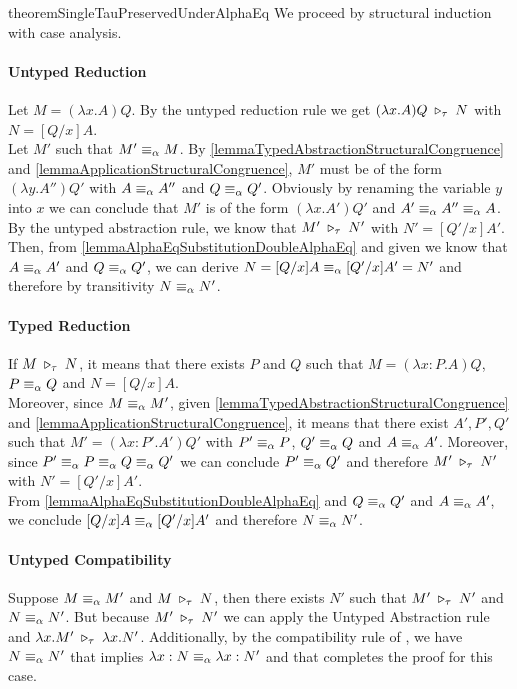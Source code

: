 \begin{longproof}{theoremSingleTauPreservedUnderAlphaEq}
We proceed by structural induction with case analysis.

\paragraph{Untyped Reduction}
Let $M=(\lambda x.A)Q$. By the untyped reduction rule we get $(\lambda x.A)Q \;\triangleright_\tau\; N$ with $N=[Q/x]A$.\\
Let $M'$ such that $M' \equiv_\alpha M$. By \cref{lemmaTypedAbstractionStructuralCongruence} and \cref{lemmaApplicationStructuralCongruence}, $M'$ must be of the form $(\lambda y.A'')Q'$ with $A \equiv_\alpha A''$ and $Q \equiv_\alpha Q'$. Obviously by renaming the variable $y$ into $x$ we can conclude that $M'$ is of the form $(\lambda x.A')Q'$ and $A' \equiv_\alpha A'' \equiv_\alpha A$.
By the untyped abstraction rule, we know that $M' \;\triangleright_\tau\; N'$ with $N'=[Q'/x]A'$. Then, from \cref{lemmaAlphaEqSubstitutionDoubleAlphaEq} and given we know that $A \equiv_\alpha A'$ and $Q \equiv_\alpha Q'$, we can derive $N=[Q/x]A \equiv_\alpha [Q'/x]A'=N'$ and therefore by transitivity $N \equiv_\alpha N'$.

\paragraph{Typed Reduction}
If $M \;\triangleright_\tau\; N$, it means that there exists $P$ and $Q$ such that $M=(\lambda x:P.A)Q$, $P \equiv_\alpha Q$ and $N=[Q/x]A$.\\
Moreover, since $M \equiv_\alpha M'$, given \cref{lemmaTypedAbstractionStructuralCongruence} and \cref{lemmaApplicationStructuralCongruence}, it means that there exist $A',P',Q'$ such that $M'=(\lambda x:P'.A')Q'$ with $P' \equiv_\alpha P$, $Q' \equiv_\alpha Q$ and $A \equiv_\alpha A'$. Moreover, since $P' \equiv_\alpha P \equiv_\alpha Q \equiv_\alpha Q'$ we can conclude $P' \equiv_\alpha Q'$ and therefore $M' \;\triangleright_\tau\; N'$ with $N'=[Q'/x]A'$.\\
From \cref{lemmaAlphaEqSubstitutionDoubleAlphaEq} and $Q \equiv_\alpha Q'$ and $A \equiv_\alpha A'$, we conclude $[Q/x]A \equiv_\alpha [Q'/x]A'$ and therefore $N \equiv_\alpha N'$.

\paragraph{Untyped Compatibility}
Suppose $M \equiv_\alpha M'$ and $M \;\triangleright_\tau\; N$, then there exists $N'$ such that $M' \;\triangleright_\tau\; N'$ and $N \equiv_\alpha N'$. But because $M' \;\triangleright_\tau\; N'$ we can apply the Untyped Abstraction rule and $\lambda x.M' \;\triangleright_\tau\; \lambda x.N'$. Additionally, by the compatibility rule of \alphaequivalence, we have $N \equiv_\alpha N'$ that implies $\lambda x:N \equiv_\alpha \lambda x:N'$ and that completes the proof for this case.


\end{longproof}
